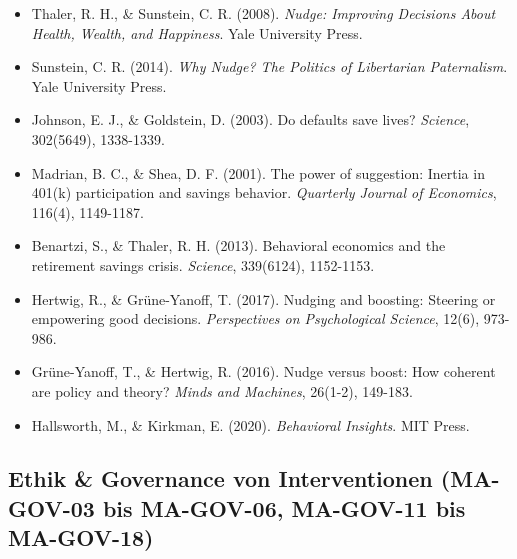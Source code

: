 \begin{itemize}[leftmargin=*]
    \item Thaler, R. H., \& Sunstein, C. R. (2008). \textit{Nudge: Improving Decisions About Health, Wealth, and Happiness}. Yale University Press.
    \item Sunstein, C. R. (2014). \textit{Why Nudge? The Politics of Libertarian Paternalism}. Yale University Press.
    \item Johnson, E. J., \& Goldstein, D. (2003). Do defaults save lives? \textit{Science}, 302(5649), 1338-1339.
    \item Madrian, B. C., \& Shea, D. F. (2001). The power of suggestion: Inertia in 401(k) participation and savings behavior. \textit{Quarterly Journal of Economics}, 116(4), 1149-1187.
    \item Benartzi, S., \& Thaler, R. H. (2013). Behavioral economics and the retirement savings crisis. \textit{Science}, 339(6124), 1152-1153.
    \item Hertwig, R., \& Grüne-Yanoff, T. (2017). Nudging and boosting: Steering or empowering good decisions. \textit{Perspectives on Psychological Science}, 12(6), 973-986.
    \item Grüne-Yanoff, T., \& Hertwig, R. (2016). Nudge versus boost: How coherent are policy and theory? \textit{Minds and Machines}, 26(1-2), 149-183.
    \item Hallsworth, M., \& Kirkman, E. (2020). \textit{Behavioral Insights}. MIT Press.
\end{itemize}

\subsection*{Ethik \& Governance von Interventionen (MA-GOV-03 bis MA-GOV-06, MA-GOV-11 bis MA-GOV-18)}

